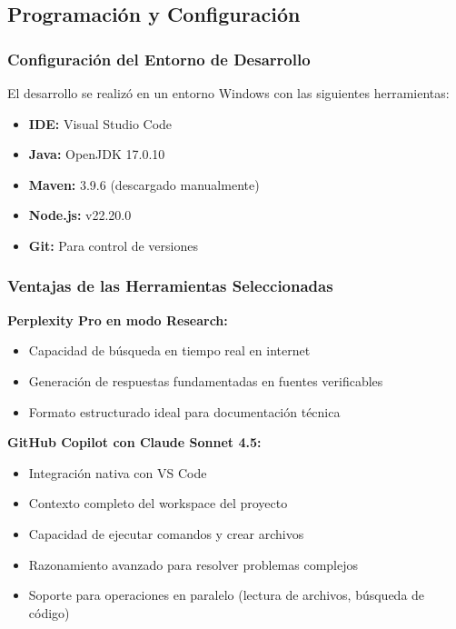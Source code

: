 \documentclass[11pt,a4paper]{article}
\begin{document}

\subsection{Programación y Configuración}

\subsubsection{Configuración del Entorno de Desarrollo}

El desarrollo se realizó en un entorno Windows con las siguientes herramientas:

\begin{itemize}
    \item \textbf{IDE:} Visual Studio Code
    \item \textbf{Java:} OpenJDK 17.0.10
    \item \textbf{Maven:} 3.9.6 (descargado manualmente)
    \item \textbf{Node.js:} v22.20.0
    \item \textbf{Git:} Para control de versiones
\end{itemize}

\subsubsection{Ventajas de las Herramientas Seleccionadas}

\textbf{Perplexity Pro en modo Research:}
\begin{itemize}
    \item Capacidad de búsqueda en tiempo real en internet
    \item Generación de respuestas fundamentadas en fuentes verificables
    \item Formato estructurado ideal para documentación técnica
\end{itemize}

\textbf{GitHub Copilot con Claude Sonnet 4.5:}
\begin{itemize}
    \item Integración nativa con VS Code
    \item Contexto completo del workspace del proyecto
    \item Capacidad de ejecutar comandos y crear archivos
    \item Razonamiento avanzado para resolver problemas complejos
    \item Soporte para operaciones en paralelo (lectura de archivos, búsqueda de código)
\end{itemize}
\end{document}
